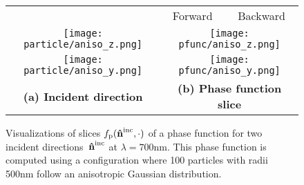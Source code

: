 \begin{figure}[t]
    \centering
    \setlength{\resLen}{1in}
    \addtolength{\tabcolsep}{-3pt}
    \small
    \begin{tabular}{ccc}
        & Forward & Backward\\
        \texttt{[image: particle/aniso\_z.png]}
        & \multicolumn{2}{c}{\texttt{[image: pfunc/aniso\_z.png]}}
        \\
        \texttt{[image: particle/aniso\_y.png]}
        & \multicolumn{2}{c}{\texttt{[image: pfunc/aniso\_y.png]}}
        \\
        \textbf{(a) Incident direction} & \multicolumn{2}{c}{\textbf{(b) Phase function slice}}
    \end{tabular}
    \caption{\label{fig:aniso1}
        Visualizations of slices $f_\mathrm{p}(\mathbf{\hat{n}}^{\text{inc}},\cdot)$ of a phase function for two incident directions~$\mathbf{\hat{n}}^{\text{inc}}$ at $\lambda = 700\text{nm}$.
        This phase function is computed using a configuration where 100 particles with radii 500nm follow an anisotropic Gaussian distribution.
    }
\end{figure}
